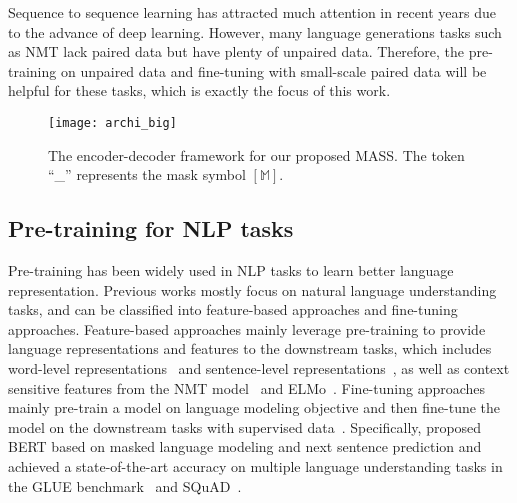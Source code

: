 \documentclass{article}
\begin{document}
	Sequence to sequence learning has attracted much attention in recent years due to the advance of deep learning. However, many language generations tasks such as NMT lack paired data but have plenty of unpaired data. Therefore, the pre-training on unpaired data and fine-tuning with small-scale paired data will be helpful for these tasks, which is exactly the focus of this work.
	


	\begin{figure*}[h]
		\small
		\centering
		\texttt{[image: archi\_big]}
		\vspace{-0.2cm}
		\caption{The encoder-decoder framework for our proposed MASS. The token ``\_'' represents the mask symbol $[\mathbb{M}]$.} 
		\label{pretrain_archi}
	\end{figure*}
	
	\subsection{Pre-training for NLP tasks}
	Pre-training has been widely used in NLP tasks to learn better language representation. Previous works mostly focus on natural language understanding tasks, and can be classified into feature-based approaches and fine-tuning approaches. Feature-based approaches mainly leverage pre-training to provide language representations and features to the downstream tasks, which includes word-level representations~\citep{brown1992class,ando2005framework,blitzer2006domain,collobert2008unified,mikolov2013distributed,pennington2014glove} and sentence-level representations~\citep{kiros2015skip,logeswaran2018efficient,le2014distributed}, as well as context sensitive features from the NMT model~\citep{mccann2017learned} and ELMo~\citep{peters2018deep}. Fine-tuning approaches mainly pre-train a model on language modeling objective and then fine-tune the model on the downstream tasks with supervised data~\citep{dai2015semi,howard2018universal,radford2018improving,devlin2018bert}. Specifically, \citet{devlin2018bert} proposed BERT based on masked language modeling and next sentence prediction and achieved a state-of-the-art accuracy on multiple language understanding tasks in the GLUE benchmark~\citep{wang2018glue} and SQuAD~\citep{rajpurkar2016squad}.
	
\end{document}
